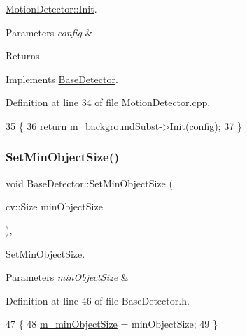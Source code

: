 \mbox{\hyperlink{class_motion_detector_af59eda71fe52b578c08472425182dc41}{Motion\+Detector\+::\+Init}}. 


\begin{DoxyParams}{Parameters}
{\em config} & \\
\hline
\end{DoxyParams}
\begin{DoxyReturn}{Returns}

\end{DoxyReturn}


Implements \mbox{\hyperlink{class_base_detector_a44c53608e9e4e3455ff553d987165260}{Base\+Detector}}.



Definition at line 34 of file Motion\+Detector.\+cpp.


\begin{DoxyCode}
35 \{
36     \textcolor{keywordflow}{return} \mbox{\hyperlink{class_motion_detector_ab0f8334cbe63bfaae0ed54650336e0d4}{m\_backgroundSubst}}->Init(config);
37 \}
\end{DoxyCode}
\mbox{\label{class_base_detector_ab459f4e77cf1110cc1ee84027f0f2a03}} 
\subsubsection{\texorpdfstring{Set\+Min\+Object\+Size()}{SetMinObjectSize()}}
{\footnotesize\ttfamily void Base\+Detector\+::\+Set\+Min\+Object\+Size (\begin{DoxyParamCaption}\item[{cv\+::\+Size}]{min\+Object\+Size }\end{DoxyParamCaption})\hspace{0.3cm}{\ttfamily [inline]}, {\ttfamily [inherited]}}



Set\+Min\+Object\+Size. 


\begin{DoxyParams}{Parameters}
{\em min\+Object\+Size} & \\
\hline
\end{DoxyParams}


Definition at line 46 of file Base\+Detector.\+h.


\begin{DoxyCode}
47     \{
48         \mbox{\hyperlink{class_base_detector_a651b938c89c94daac4763728637d90c9}{m\_minObjectSize}} = minObjectSize;
49     \}
\end{DoxyCode}


